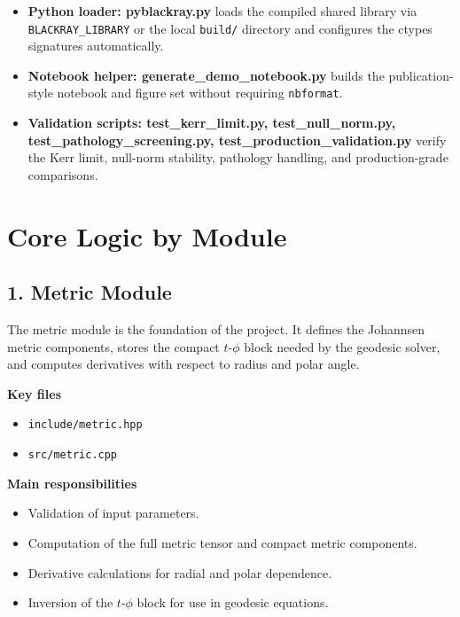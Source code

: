 \documentclass[11pt]{article}
\begin{document}
\begin{itemize}[leftmargin=1.5em]
    \item \textbf{Python loader: pyblackray.py} \textemdash{} loads the compiled shared library via \texttt{BLACKRAY\_LIBRARY} or the local \texttt{build/} directory and configures the ctypes signatures automatically.
    \item \textbf{Notebook helper: generate\_demo\_notebook.py} \textemdash{} builds the publication-style notebook and figure set without requiring \texttt{nbformat}.
    \item \textbf{Validation scripts: test\_kerr\_limit.py, test\_null\_norm.py, test\_pathology\_screening.py, test\_production\_validation.py} \textemdash{} verify the Kerr limit, null-norm stability, pathology handling, and production-grade comparisons.
\end{itemize}

\section{Core Logic by Module}

\subsection{1. Metric Module}

The metric module is the foundation of the project. It defines the Johannsen metric components, stores the compact $t$-$\phi$ block needed by the geodesic solver, and computes derivatives with respect to radius and polar angle.

\textbf{Key files}

\begin{itemize}[leftmargin=1.5em]
    \item \texttt{include/metric.hpp}
    \item \texttt{src/metric.cpp}
\end{itemize}

\textbf{Main responsibilities}

\begin{itemize}[leftmargin=1.5em]
    \item Validation of input parameters.
    \item Computation of the full metric tensor and compact metric components.
    \item Derivative calculations for radial and polar dependence.
    \item Inversion of the $t$-$\phi$ block for use in geodesic equations.
\end{itemize}
\end{document}
